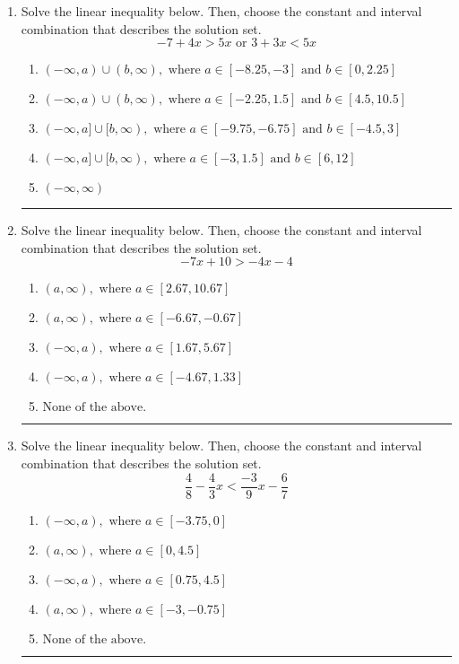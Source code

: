 \documentclass[14pt]{extbook}
\newcommand{\litem}[1]{\item#1\hspace*{-1cm}\rule{\textwidth}{0.4pt}}
\begin{document}
\begin{enumerate}
{\begin{enumerate}[label=\Alph*.]
\end{enumerate} }
\litem{
Solve the linear inequality below. Then, choose the constant and interval combination that describes the solution set.\[ -7 + 4 x > 5 x \text{ or } 3 + 3 x < 5 x \]\begin{enumerate}[label=\Alph*.]
\item \( (-\infty, a) \cup (b, \infty), \text{ where } a \in [-8.25, -3] \text{ and } b \in [0, 2.25] \)
\item \( (-\infty, a) \cup (b, \infty), \text{ where } a \in [-2.25, 1.5] \text{ and } b \in [4.5, 10.5] \)
\item \( (-\infty, a] \cup [b, \infty), \text{ where } a \in [-9.75, -6.75] \text{ and } b \in [-4.5, 3] \)
\item \( (-\infty, a] \cup [b, \infty), \text{ where } a \in [-3, 1.5] \text{ and } b \in [6, 12] \)
\item \( (-\infty, \infty) \)

\end{enumerate} }
\litem{
Solve the linear inequality below. Then, choose the constant and interval combination that describes the solution set.\[ -7x + 10 > -4x -4 \]\begin{enumerate}[label=\Alph*.]
\item \( (a, \infty), \text{ where } a \in [2.67, 10.67] \)
\item \( (a, \infty), \text{ where } a \in [-6.67, -0.67] \)
\item \( (-\infty, a), \text{ where } a \in [1.67, 5.67] \)
\item \( (-\infty, a), \text{ where } a \in [-4.67, 1.33] \)
\item \( \text{None of the above}. \)

\end{enumerate} }
\litem{
Solve the linear inequality below. Then, choose the constant and interval combination that describes the solution set.\[ \frac{4}{8} - \frac{4}{3} x < \frac{-3}{9} x - \frac{6}{7} \]\begin{enumerate}[label=\Alph*.]
\item \( (-\infty, a), \text{ where } a \in [-3.75, 0] \)
\item \( (a, \infty), \text{ where } a \in [0, 4.5] \)
\item \( (-\infty, a), \text{ where } a \in [0.75, 4.5] \)
\item \( (a, \infty), \text{ where } a \in [-3, -0.75] \)
\item \( \text{None of the above}. \)


\end{enumerate}}
\end{enumerate}
\end{document}
